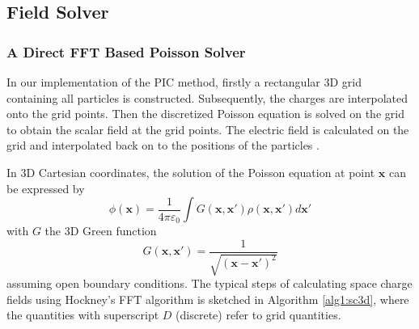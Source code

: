 \documentclass[acus]{JAC2003}
\newcommand{\bs}[1]{\mathbf #1}
\begin{document}

\subsection{Field Solver}
\subsubsection{A Direct FFT Based Poisson Solver}
In our implementation of the PIC method, firstly a rectangular 3D grid containing all particles is constructed.  Subsequently, the charges 
are interpolated onto the grid points. Then the discretized Poisson equation is solved on the grid to obtain the scalar field at the grid points. 
The electric field is calculated on the grid and interpolated back on to the positions of the particles .


In 3D Cartesian coordinates, the solution of the Poisson equation at point $\bs{x}$ can be expressed by 
\begin{equation}\label{eq:Poten}
  \phi(\bs{x})= \frac{1}{4\pi\varepsilon_0}\int{G(\bs{x},\bs{x}')\rho(\bs{x},\bs{x}')d\bs{x}'}
\end{equation}
with $G$ the 3D Green function 
\begin{equation}\label{eq:Green}
  G(\bs{x},\bs{x}')= \frac{1}{\sqrt{(\bs{x}-\bs{x}')^2}}
\end{equation}
assuming open boundary conditions.
The typical steps of calculating space charge fields using Hockney's FFT algorithm is sketched in Algorithm \ref{alg1:sc3d},
where the quantities with superscript $D$ (discrete) refer to grid quantities.
\end{document}
